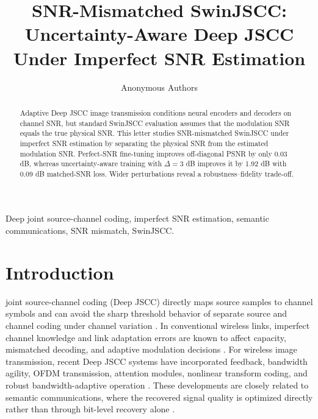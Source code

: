 \documentclass[10pt,journal]{IEEEtran}
\title{SNR-Mismatched SwinJSCC: Uncertainty-Aware Deep JSCC Under Imperfect SNR Estimation}
\author{Anonymous Authors}
\begin{document}
\maketitle

\begin{abstract}
Adaptive Deep JSCC image transmission conditions neural encoders and decoders on channel SNR, but standard SwinJSCC evaluation assumes that the modulation SNR equals the true physical SNR. This letter studies SNR-mismatched SwinJSCC under imperfect SNR estimation by separating the physical SNR from the estimated modulation SNR. Perfect-SNR fine-tuning improves off-diagonal PSNR by only 0.03 dB, whereas uncertainty-aware training with $\Delta=3$ dB improves it by 1.92 dB with 0.09 dB matched-SNR loss. Wider perturbations reveal a robustness--fidelity trade-off.
\end{abstract}

\begin{IEEEkeywords}
Deep joint source-channel coding, imperfect SNR estimation, semantic communications, SNR mismatch, SwinJSCC.
\end{IEEEkeywords}

\section{Introduction}

 joint source-channel coding (Deep JSCC) directly maps source samples to channel symbols and can avoid the sharp threshold behavior of separate source and channel coding under channel variation \cite{shannon1948mathematical,cover2006elements,bourtsoulatze2019deepjscc}. In conventional wireless links, imperfect channel knowledge and link adaptation errors are known to affect capacity, mismatched decoding, and adaptive modulation decisions \cite{medard2000imperfect,merhav1994mismatched,lapidoth2002fading,goldsmith1997mqam}. For wireless image transmission, recent Deep JSCC systems have incorporated feedback, bandwidth agility, OFDM transmission, attention modules, nonlinear transform coding, and robust bandwidth-adaptive operation \cite{kurka2020deepjsccf,kurka2021bandwidth,yang2021ofdm,xu2022attention,dai2022ntscc,bian2023deepjscclpp}. These developments are closely related to semantic communications, where the recovered signal quality is optimized directly rather than through bit-level recovery alone \cite{xie2020initial,xie2021semantic}.
\end{document}
